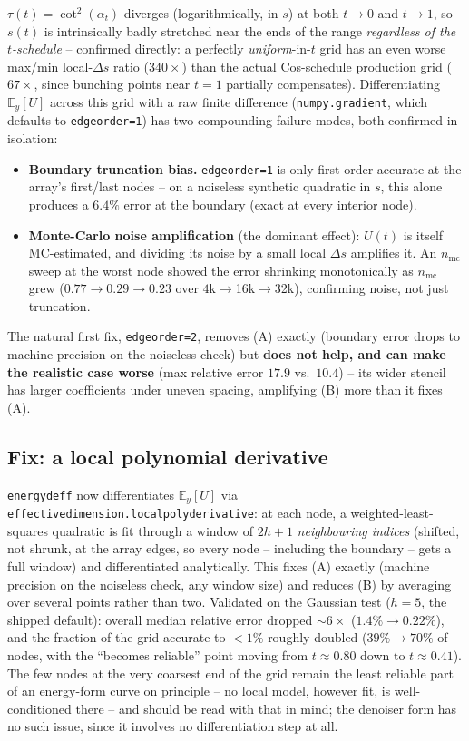 \documentclass[11pt]{article}
\newcommand{\E}{\mathbb{E}}
\newcommand{\code}[1]{\texttt{#1}}
\renewcommand{\_}{\origunderscore\allowbreak}
\begin{document}
$\tau(t)=\cot^2(\alpha_t)$ diverges (logarithmically, in $s$) at both
$t\to0$ and $t\to1$, so $s(t)$ is intrinsically badly stretched near the
ends of the range \emph{regardless of the $t$-schedule} -- confirmed
directly: a perfectly \emph{uniform}-in-$t$ grid has an even worse
max/min local-$\Delta s$ ratio ($340\times$) than the actual Cos-schedule
production grid ($67\times$, since bunching points near $t=1$ partially
compensates). Differentiating $\E_y[U]$ across this grid with a raw
finite difference (\code{numpy.gradient}, which defaults to
\code{edge\_order=1}) has two compounding failure modes, both confirmed in
isolation:
\begin{itemize}
  \item[(A)] \textbf{Boundary truncation bias.} \code{edge\_order=1} is
        only first-order accurate at the array's first/last nodes -- on a
        noiseless synthetic quadratic in $s$, this alone produces a
        $6.4\%$ error at the boundary (exact at every interior node).
  \item[(B)] \textbf{Monte-Carlo noise amplification} (the dominant
        effect): $U(t)$ is itself MC-estimated, and dividing its noise by
        a small local $\Delta s$ amplifies it. An $n_{\mathrm{mc}}$ sweep
        at the worst node showed the error shrinking monotonically as
        $n_{\mathrm{mc}}$ grew ($0.77\to0.29\to0.23$ over
        $4$k$\to$16k$\to$32k), confirming noise, not just truncation.
\end{itemize}
The natural first fix, \code{edge\_order=2}, removes (A) exactly (boundary
error drops to machine precision on the noiseless check) but \textbf{does
not help, and can make the realistic case worse} (max relative error
$17.9$ vs.\ $10.4$) -- its wider stencil has larger coefficients under
uneven spacing, amplifying (B) more than it fixes (A).

\subsection{Fix: a local polynomial derivative}

\code{energy\_d\_eff} now differentiates $\E_y[U]$ via
\code{effective\_dimension.local\_poly\_derivative}: at each node, a
weighted-least-squares quadratic is fit through a window of $2h+1$
\emph{neighbouring indices} (shifted, not shrunk, at the array edges, so
every node -- including the boundary -- gets a full window) and
differentiated analytically. This fixes (A) exactly (machine precision on
the noiseless check, any window size) and reduces (B) by averaging over
several points rather than two. Validated on the Gaussian test
($h=5$, the shipped default): overall median relative error dropped
$\sim6\times$ ($1.4\%\to0.22\%$), and the fraction of the grid accurate to
$<1\%$ roughly doubled ($39\%\to70\%$ of nodes, with the ``becomes
reliable'' point moving from $t\approx0.80$ down to $t\approx0.41$). The
few nodes at the very coarsest end of the grid remain the least reliable
part of an energy-form curve on principle -- no local model, however
fit, is well-conditioned there -- and should be read with that in mind;
the denoiser form has no such issue, since it involves no differentiation
step at all.
\end{document}
